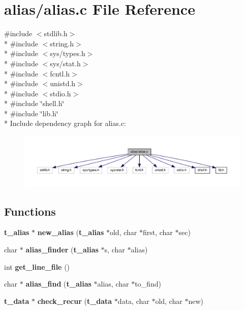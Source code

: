\section{alias/alias.c File Reference}
\label{alias_8c}
{\ttfamily \#include $<$stdlib.\-h$>$}\\*
{\ttfamily \#include $<$string.\-h$>$}\\*
{\ttfamily \#include $<$sys/types.\-h$>$}\\*
{\ttfamily \#include $<$sys/stat.\-h$>$}\\*
{\ttfamily \#include $<$fcntl.\-h$>$}\\*
{\ttfamily \#include $<$unistd.\-h$>$}\\*
{\ttfamily \#include $<$stdio.\-h$>$}\\*
{\ttfamily \#include \char`\"{}shell.\-h\char`\"{}}\\*
{\ttfamily \#include \char`\"{}lib.\-h\char`\"{}}\\*
Include dependency graph for alias.\-c\-:\nopagebreak
\begin{figure}[H]
\begin{center}
\leavevmode
\includegraphics[width=350pt]{alias_8c__incl}
\end{center}
\end{figure}
\subsection*{Functions}
\begin{DoxyCompactItemize}
\item 
{\bf t\-\_\-alias} $\ast$ {\bf new\-\_\-alias} ({\bf t\-\_\-alias} $\ast$old, char $\ast$first, char $\ast$sec)
\item 
char $\ast$ {\bf alias\-\_\-finder} ({\bf t\-\_\-alias} $\ast$s, char $\ast$alias)
\item 
int {\bf get\-\_\-line\-\_\-file} ()
\item 
char $\ast$ {\bf alias\-\_\-find} ({\bf t\-\_\-alias} $\ast$alias, char $\ast$to\-\_\-find)
\item 
{\bf t\-\_\-data} $\ast$ {\bf check\-\_\-recur} ({\bf t\-\_\-data} $\ast$data, char $\ast$old, char $\ast$new)
\end{DoxyCompactItemize}


